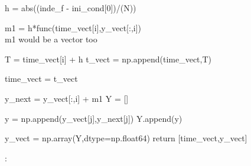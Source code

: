 \documentclass[12pt]{article}
\begin{document}
\begin{algorithm}

\begin{algorithmic}
     
        \State h = abs((inde\_f - ini\_cond[0])/(N))  
            
          \State  m1 = h*func(time\_vect[i],y\_vect[:,i])\\   
          \Comment m1 would be a vector too

           \State T = time\_vect[i] + h
           \State t\_vect = np.append(time\_vect,T)
           
           
            \State time\_vect = t\_vect
        
           \State y\_next = y\_vect[:,i] + m1
            \State Y = []
            
               \State y = np.append(y\_vect[j],y\_next[j])
                \State Y.append(y)
                \EndFor
        
            \State y\_vect = np.array(Y,dtype=np.float64)
    \EndFor
        \State return [time\_vect,y\_vect]
        
    \Else : 
      
      \EndIf
\end{algorithmic}
\end{algorithm}
\end{document}
